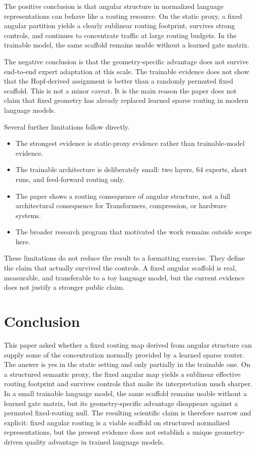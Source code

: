 \documentclass[10pt,letterpaper]{article}
\begin{document}
The positive conclusion is that angular structure in normalized language representations can behave like a routing resource. On the static proxy, a fixed angular partition yields a clearly sublinear routing footprint, survives strong controls, and continues to concentrate traffic at large routing budgets. In the trainable model, the same scaffold remains usable without a learned gate matrix.

The negative conclusion is that the geometry-specific advantage does not survive end-to-end expert adaptation at this scale. The trainable evidence does not show that the Hopf-derived assignment is better than a randomly permuted fixed scaffold. This is not a minor caveat. It is the main reason the paper does not claim that fixed geometry has already replaced learned sparse routing in modern language models.

Several further limitations follow directly.
\begin{itemize}
\item The strongest evidence is static-proxy evidence rather than trainable-model evidence.
\item The trainable architecture is deliberately small: two layers, 64 experts, short runs, and feed-forward routing only.
\item The paper shows a routing consequence of angular structure, not a full architectural consequence for Transformers, compression, or hardware systems.
\item The broader research program that motivated the work remains outside scope here.
\end{itemize}

These limitations do not reduce the result to a formatting exercise. They define the claim that actually survived the controls. A fixed angular scaffold is real, measurable, and transferable to a toy language model, but the current evidence does not justify a stronger public claim.

\section{Conclusion}
This paper asked whether a fixed routing map derived from angular structure can supply some of the concentration normally provided by a learned sparse router. The answer is yes in the static setting and only partially in the trainable one. On a structured semantic proxy, the fixed angular map yields a sublinear effective routing footprint and survives controls that make its interpretation much sharper. In a small trainable language model, the same scaffold remains usable without a learned gate matrix, but its geometry-specific advantage disappears against a permuted fixed-routing null. The resulting scientific claim is therefore narrow and explicit: fixed angular routing is a viable scaffold on structured normalized representations, but the present evidence does not establish a unique geometry-driven quality advantage in trained language models.
\end{document}
